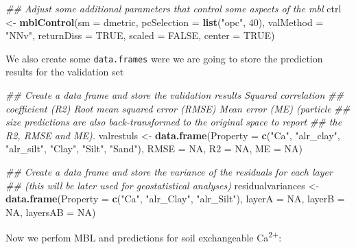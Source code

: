 \documentclass[]{book}
\newenvironment{Shaded}{\begin{snugshade}}{\end{snugshade}}
\newcommand{\CommentTok}[1]{\textcolor[rgb]{0.56,0.35,0.01}{\textit{#1}}}
\newcommand{\DataTypeTok}[1]{\textcolor[rgb]{0.13,0.29,0.53}{#1}}
\newcommand{\DecValTok}[1]{\textcolor[rgb]{0.00,0.00,0.81}{#1}}
\newcommand{\KeywordTok}[1]{\textcolor[rgb]{0.13,0.29,0.53}{\textbf{#1}}}
\newcommand{\NormalTok}[1]{#1}
\newcommand{\OtherTok}[1]{\textcolor[rgb]{0.56,0.35,0.01}{#1}}
\newcommand{\StringTok}[1]{\textcolor[rgb]{0.31,0.60,0.02}{#1}}
\begin{document}
\begin{Shaded}
\begin{Highlighting}[]
\CommentTok{## Adjust some additional parameters that control some aspects of the mbl}
\NormalTok{ctrl <-}\StringTok{ }\KeywordTok{mblControl}\NormalTok{(}\DataTypeTok{sm =}\NormalTok{ dmetric, }\DataTypeTok{pcSelection =} \KeywordTok{list}\NormalTok{(}\StringTok{"opc"}\NormalTok{, }\DecValTok{40}\NormalTok{), }\DataTypeTok{valMethod =} \StringTok{"NNv"}\NormalTok{, }
                    \DataTypeTok{returnDiss =} \OtherTok{TRUE}\NormalTok{, }\DataTypeTok{scaled =} \OtherTok{FALSE}\NormalTok{, }\DataTypeTok{center =} \OtherTok{TRUE}\NormalTok{)}
\end{Highlighting}
\end{Shaded}

We also create some \texttt{data.frames} were we are going to store the prediction results for the validation set

\begin{Shaded}
\begin{Highlighting}[]
\CommentTok{## Create a data frame and store the validation results Squared correlation}
\CommentTok{## coefficient (R2) Root mean squared error (RMSE) Mean error (ME) (particle}
\CommentTok{## size predictions are also back-transformed to the original space to report}
\CommentTok{## the R2, RMSE and ME).}
\NormalTok{valrestuls <-}\StringTok{ }\KeywordTok{data.frame}\NormalTok{(}\DataTypeTok{Property =} \KeywordTok{c}\NormalTok{(}\StringTok{"Ca"}\NormalTok{, }\StringTok{"alr_clay"}\NormalTok{, }\StringTok{"alr_silt"}\NormalTok{, }\StringTok{"Clay"}\NormalTok{, }
                    \StringTok{"Silt"}\NormalTok{, }\StringTok{"Sand"}\NormalTok{), }\DataTypeTok{RMSE =} \OtherTok{NA}\NormalTok{, }\DataTypeTok{R2 =} \OtherTok{NA}\NormalTok{, }\DataTypeTok{ME =} \OtherTok{NA}\NormalTok{)}

\CommentTok{## Create a data frame and store the variance of the residuals for each layer}
\CommentTok{## (this will be later used for geostatistical analyses)}
\NormalTok{residualvariances <-}\StringTok{ }\KeywordTok{data.frame}\NormalTok{(}\DataTypeTok{Property =} \KeywordTok{c}\NormalTok{(}\StringTok{"Ca"}\NormalTok{, }\StringTok{"alr_Clay"}\NormalTok{, }\StringTok{"alr_Silt"}\NormalTok{), }
                    \DataTypeTok{layerA =} \OtherTok{NA}\NormalTok{, }\DataTypeTok{layerB =} \OtherTok{NA}\NormalTok{, }\DataTypeTok{layersAB =} \OtherTok{NA}\NormalTok{)}
\end{Highlighting}
\end{Shaded}

Now we perfom MBL and predictions for soil exchangeable Ca\textsuperscript{2+}:
\end{document}

